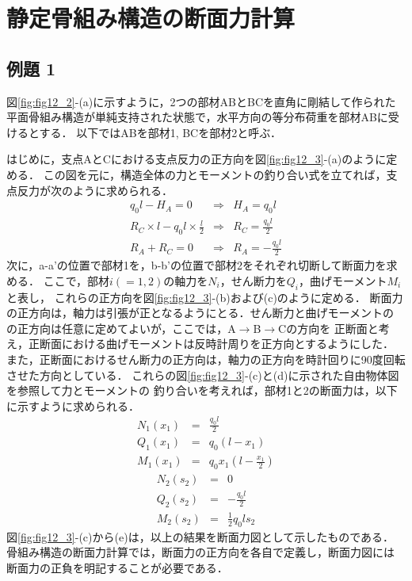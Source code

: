 \documentclass[10pt,a4j]{jbook}
\begin{document}
\section{静定骨組み構造の断面力計算}
\subsection{例題 1}
図\ref{fig:fig12_2}-(a)に示すように，2つの部材ABとBCを直角に剛結して作られた
平面骨組み構造が単純支持された状態で，水平方向の等分布荷重を部材ABに受けるとする．
以下ではABを部材1, BCを部材2と呼ぶ．

はじめに，支点AとCにおける支点反力の正方向を図\ref{fig:fig12_3}-(a)のように定める．
この図を元に，構造全体の力とモーメントの釣り合い式を立てれば，支点反力が次のように求められる．
\begin{eqnarray}
	q_0l-H_A=0 & \Rightarrow & H_A=q_0l \\ 
	R_C\times l -q_0l \times \frac{l}{2}
	 & \Rightarrow & R_C=\frac{q_0l}{2} \\ 
	R_A+R_C=0 &\Rightarrow& R_A=-\frac{q_0l}{2}
\end{eqnarray}
次に，a-a'の位置で部材1を，b-b'の位置で部材2をそれぞれ切断して断面力を求める．
ここで，部材$i(=1,2)$の軸力を$N_i$，せん断力を$Q_i$，曲げモーメント$M_i$と表し，
これらの正方向を図\ref{fig:fig12_3}-(b)および(c)のように定める．
断面力の正方向は，軸力は引張が正となるようにとる．せん断力と曲げモーメントの
の正方向は任意に定めてよいが，ここでは，A$\rightarrow$B$\rightarrow$Cの方向を
正断面と考え，正断面における曲げモーメントは反時計周りを正方向とするようにした．
また，正断面におけるせん断力の正方向は，軸力の正方向を時計回りに90度回転させた方向としている．
これらの図\ref{fig:fig12_3}-(c)と(d)に示された自由物体図を参照して力とモーメントの
釣り合いを考えれば，部材1と2の断面力は，以下に示すように求められる．
\begin{eqnarray}
	N_1(x_1) &= & \frac{q_0l}{2}  
	\\
	Q_1(x_1) &= & q_0(l-x_1)
	\\
	M_1(x_1) &= & q_0x_1\left(l-\frac{x_1}{2}\right)
\end{eqnarray}
\begin{eqnarray}
	N_2(s_2) &= & 0
	\\
	Q_2(s_2) &= & -\frac{q_0l}{2}
	\\
	M_2(s_2) &= & \frac{1}{2}q_0ls_2
\end{eqnarray}
図\ref{fig:fig12_3}-(c)から(e)は，以上の結果を断面力図として示したものである．
骨組み構造の断面力計算では，断面力の正方向を各自で定義し，断面力図には
断面力の正負を明記することが必要である．
\end{document}

